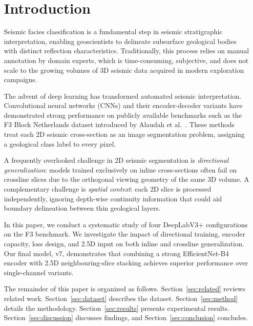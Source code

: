 \documentclass[journal]{IEEEtran}
\begin{document}
\section{Introduction}

Seismic facies classification is a fundamental step in seismic stratigraphic interpretation, enabling geoscientists to delineate subsurface geological bodies with distinct reflection characteristics. Traditionally, this process relies on manual annotation by domain experts, which is time-consuming, subjective, and does not scale to the growing volumes of 3D seismic data acquired in modern exploration campaigns.

The advent of deep learning has transformed automated seismic interpretation. Convolutional neural networks (CNNs) and their encoder-decoder variants have demonstrated strong performance on publicly available benchmarks such as the F3 Block Netherlands dataset introduced by Alaudah et al.~\cite{alaudah2019}. These methods treat each 2D seismic cross-section as an image segmentation problem, assigning a geological class label to every pixel.

A frequently overlooked challenge in 2D seismic segmentation is \emph{directional generalization}: models trained exclusively on inline cross-sections often fail on crossline slices due to the orthogonal viewing geometry of the same 3D volume. A complementary challenge is \emph{spatial context}: each 2D slice is processed independently, ignoring depth-wise continuity information that could aid boundary delineation between thin geological layers.

In this paper, we conduct a systematic study of four DeepLabV3+ configurations on the F3 benchmark. We investigate the impact of directional training, encoder capacity, loss design, and 2.5D input on both inline and crossline generalization. Our final model, v7, demonstrates that combining a strong EfficientNet-B4 encoder with 2.5D neighbouring-slice stacking achieves superior performance over single-channel variants.

The remainder of this paper is organized as follows. Section~\ref{sec:related} reviews related work. Section~\ref{sec:dataset} describes the dataset. Section~\ref{sec:method} details the methodology. Section~\ref{sec:results} presents experimental results. Section~\ref{sec:discussion} discusses findings, and Section~\ref{sec:conclusion} concludes.

\end{document}
